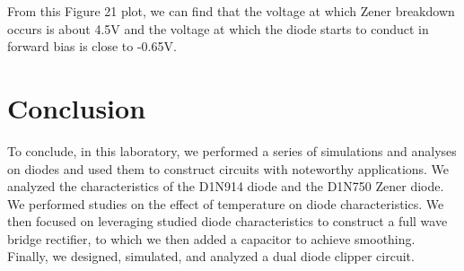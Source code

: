\documentclass[conference]{IEEEtran}
\begin{document}
From this Figure 21 plot, we can find that the voltage at which Zener breakdown occurs is about 4.5V and the voltage at which the diode starts to conduct in forward bias is close to -0.65V.
\section{Conclusion}
To conclude, in this laboratory, we performed a series of simulations and analyses on diodes and used them to construct circuits with noteworthy applications. We analyzed the characteristics of the D1N914 diode and the D1N750 Zener diode. We performed studies on the effect of temperature on diode characteristics. We then focused on leveraging studied diode characteristics to construct a full wave bridge rectifier, to which we then added a capacitor to achieve smoothing. Finally, we designed, simulated, and analyzed a dual diode clipper circuit.
\end{document}
